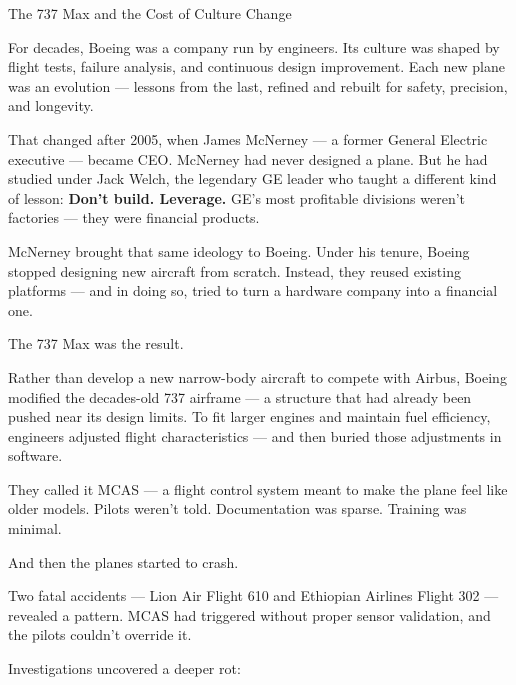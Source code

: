 \begin{HistoricalSidebar}{The 737 Max and the Cost of Culture Change}

  For decades, Boeing was a company run by engineers.  
  Its culture was shaped by flight tests, failure analysis, and continuous design improvement.  
  Each new plane was an evolution — lessons from the last, refined and rebuilt for safety, precision, and longevity.
  
  \medskip
  
  That changed after 2005, when James McNerney — a former General Electric executive — became CEO.  
  McNerney had never designed a plane. But he had studied under Jack Welch, the legendary GE leader who taught a 
  different kind of lesson:  
  \textbf{Don’t build. Leverage.}  
  GE’s most profitable divisions weren’t factories — they were financial products.
  
  \medskip
  
  McNerney brought that same ideology to Boeing.  
  Under his tenure, Boeing stopped designing new aircraft from scratch.  
  Instead, they reused existing platforms — and in doing so, tried to turn a hardware company into a financial one.
  
  \medskip
  
  The 737 Max was the result.
  
  \medskip
  
  Rather than develop a new narrow-body aircraft to compete with Airbus, Boeing modified the decades-old 737 airframe — 
  a structure that had already been pushed near its design limits.  
  To fit larger engines and maintain fuel efficiency, engineers adjusted flight characteristics — and then buried those 
  adjustments in software.
  
  \medskip
  
  They called it MCAS — a flight control system meant to make the plane feel like older models.  
  Pilots weren’t told. Documentation was sparse. Training was minimal.
  
  \medskip
  
  And then the planes started to crash.
  
  \medskip
  
  Two fatal accidents — Lion Air Flight 610 and Ethiopian Airlines Flight 302 — revealed a pattern.  
  MCAS had triggered without proper sensor validation, and the pilots couldn’t override it.
  
  \medskip
  
  Investigations uncovered a deeper rot:  


\end{HistoricalSidebar}
